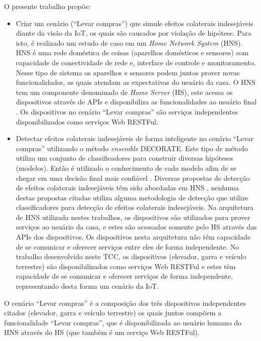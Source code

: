 O presente trabalho propõe:
\begin{itemize}
\item Criar um cenário (``Levar compras'') que simule efeitos colaterais indesejáveis diante da visão da IoT, os quais são causados por violação de hipótese. Para isto, é realizado um estudo de caso em um \textit{Home Network System} (HNS). HNS é uma rede doméstica de coisas (aparelhos domésticos e sensores) com capacidade de conectividade de rede e, interface de controle e monitoramento. Nesse tipo de sistema os aparelhos e sensores podem juntos prover novas funcionalidades, as quais atendam as expectativas do usuário da casa. O HNS tem um componente denominado de \textit{Home Server} (HS), este acessa os dispositivos através de APIs e disponibiliza as funcionalidades ao usuário final \cite{Nakamura:2009, Ikegami:2013}. Os dispositivos no cenário ``Levar compras'' são serviços independentes disponibilizados como serviços Web RESTFul.
\item Detectar efeitos colaterais indesejáveis de forma inteligente no cenário ``Levar compras'' utilizando o método \textit{ensemble} DECORATE. Este tipo de método utiliza um conjunto de classificadores para construir diversas hipóteses (modelos). Então é utilizado o conhecimento de cada modelo afim de se chegar em uma decisão final mais confiável \cite{Melville:2004}. Diversas propostas de detecção de efeitos colaterais indesejáveis têm sido abordadas em HNS \cite{Wilson:2008, Nakamura:2009, Ikegami:2013, Maternaghan:2013, Alfakeeh:2016}, nenhuma destas propostas citadas utiliza alguma metodologia de detecção que utilize classificadores para detecção de efeitos colaterais indesejáveis. Na arquitetura de HNS utilizada nestes trabalhos, os dispositivos são utilizados para prover serviços ao usuário da casa, e estes são acessados somente pelo HS através das APIs dos dispositivos. Os dispositivos nesta arquitetura não têm capacidade de se comunicar e oferecer serviços entre eles de forma independente. No trabalho desenvolvido neste TCC, os dispositivos (elevador, garra e veículo terrestre) são disponibilizados como serviços Web RESTFul e estes têm capacidade de se comunicar e oferecer serviços de forma independente, representando desta forma um cenário da IoT.
\end{itemize}

O cenário ``Levar compras'' é a composição dos três dispositivos independentes citados (elevador, garra e veículo terrestre) os quais juntos compõem a funcionalidade ``Levar compras'', que é disponibilizada ao usuário humano do HNS através do HS (que também é um serviço Web RESTFul).

